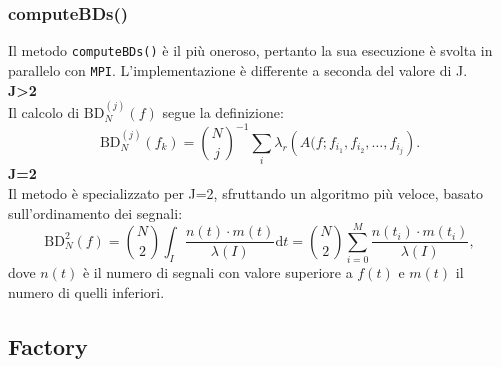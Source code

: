\documentclass[9pt]{beamer}
\begin{document}
\begin{frame}
 \frametitle{computeBDs()}
Il metodo \texttt{computeBDs()} \`e il pi\`u oneroso, pertanto la sua esecuzione \`e svolta in parallelo con \texttt{MPI}. L'implementazione \`e
differente a seconda del valore di J.\\
\vspace{0.5cm}
\textbf{J>2}\\
\smallskip
Il calcolo di $\text{BD}^{(j)}_N(f)$ segue la definizione: 
\[
 \text{BD}^{(j)}_N(f_k) = {N \choose j}^{-1} \sum_{i} \lambda_r \left( A(f; f_{i_1}, f_{i_2}, \ldots, f_{i_j} \right).
\]
\textbf{J=2}\\
\smallskip
Il metodo \`e specializzato per J=2, sfruttando un algoritmo pi\`u veloce, basato sull'ordinamento dei segnali:
\[
  \text{BD}^{2}_{N}(f) = { N \choose 2 } \int_{I} \frac{n (t ) \cdot m (t)}{\lambda \left(I\right)} \text{d}t = { N \choose 2 } \sum_{i=0}^M \frac{n (t_i ) \cdot m (t_i)}{\lambda \left(I\right)},
\]
dove $n(t)$ \`e il numero di segnali con valore superiore a $f(t)$ e $m(t)$ il numero di quelli inferiori. 



\end{frame}


\subsection{Factory}
\end{document}
